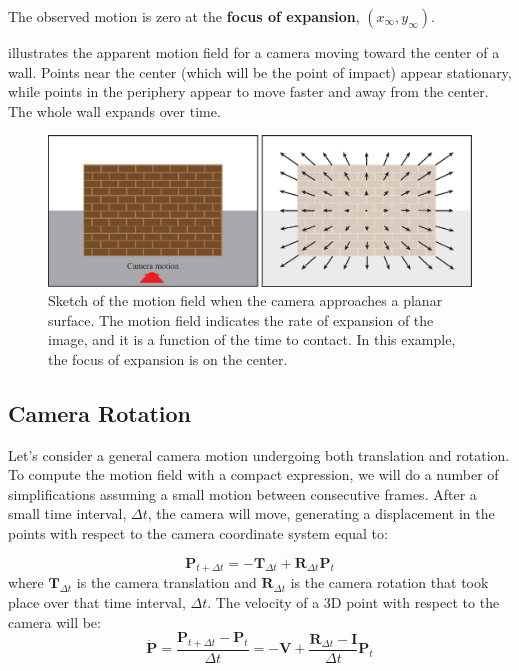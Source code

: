 The observed motion is zero at the {\bf focus of expansion}, $(x_{\infty}, y_{\infty})$. 

\Fig{\ref{fig:camera_forward_translation_flow}} illustrates the apparent motion field for a camera moving toward the center of a wall. Points near the center (which will be the point of impact) appear stationary, while points in the periphery appear to move faster and away from the center. The whole wall expands over time. 

\begin{figure}[h!]
\centerline{
\includegraphics[width=1\linewidth]{figures/optical_flow/camera_forward_translation_flow.eps}
} 
\caption{Sketch of the motion field when the camera approaches a planar surface. The motion field indicates the rate of expansion of the image, and it is a function of the time to contact. In this example, the focus of expansion is on the center.}
\label{fig:camera_forward_translation_flow}
\end{figure}

\subsection{Camera Rotation}

Let's consider a general camera motion undergoing both translation and rotation. To compute the motion field with a compact expression, we will do a number of simplifications assuming a small motion between consecutive frames. After a small time interval, $\Delta t$, the camera will move, generating a displacement in the points with respect to the camera coordinate system equal to:

\begin{equation}
\mathbf{P}_{t+\Delta t} = - \mathbf{T}_{\Delta t}  + \mathbf{R}_{\Delta t} \mathbf{P}_t 
\end{equation}
where $\mathbf{T}_{\Delta t}$ is the camera translation and $\mathbf{R}_{\Delta t}$ is the camera rotation that took place over that time interval, $\Delta t$. The velocity of a 3D point with respect to the camera will be:
\begin{equation}
\dot{\mathbf{P}} = \frac{\mathbf{P}_{t+\Delta t} - \mathbf{P}_{t}}{\Delta t} = - \mathbf{V} + \frac{\mathbf{R}_{\Delta t} -\mathbf{I}}{\Delta t} \mathbf{P}_t
\label{eq:general_camera_motion_equation_full}
\end{equation}

